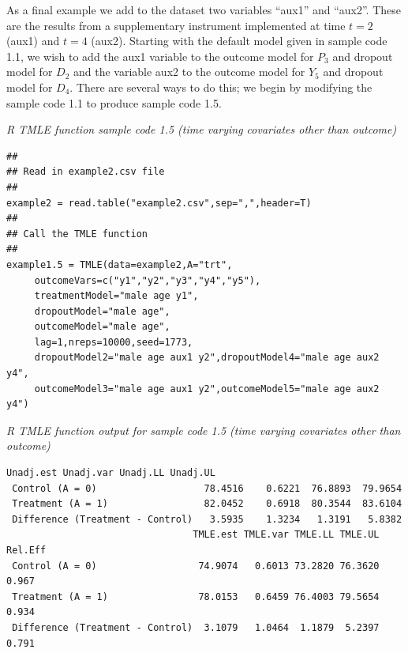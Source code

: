\documentclass[10pt]{article}
\renewcommand{\baselinestretch}{1.3}
\begin{document}
As a final example we add to the dataset two variables ``aux1'' and ``aux2''.  These are the results from a supplementary instrument implemented at time $t=2$ (aux1) and $t=4$ (aux2).  Starting with the default model given in sample code 1.1, we wish to add the aux1 variable to the outcome model for $P_3$ and dropout model for $D_2$ and the variable aux2 to the outcome model for $Y_5$ and dropout model for $D_4$.  There are several ways to do this; we begin by modifying the sample code 1.1 to produce sample code 1.5.
\newpage
\begin{minipage}{\textwidth}
\renewcommand{\baselinestretch}{1.0}\selectfont%
\begin{minipage}[l]{5.6in}
\normalsize\em%
R TMLE function sample code 1.5 (time varying covariates other than outcome)
\end{minipage}\vspace{-0.08in}
\begin{Verbatim}[baselinestretch=1.0, fontsize=\small, frame=single, commandchars=\\\{\}]
##
## Read in example2.csv file
##
example2 = read.table("example2.csv",sep=",",header=T)
##
## Call the TMLE function
##
example1.5 = TMLE(data=example2,A="trt",
     outcomeVars=c("y1","y2","y3","y4","y5"),
     treatmentModel="male age y1",
     dropoutModel="male age",
     outcomeModel="male age",
     lag=1,nreps=10000,seed=1773,
     dropoutModel2="male age aux1 y2",dropoutModel4="male age aux2 y4",
     outcomeModel3="male age aux1 y2",outcomeModel5="male age aux2 y4")
\end{Verbatim}
\end{minipage}
\vspace{0.2in}

\begin{minipage}{\textwidth}
\renewcommand{\baselinestretch}{1.0}\selectfont%
\begin{minipage}[l]{5.6in}
\normalsize\em%
R TMLE function output for sample code 1.5 (time varying covariates other than outcome)
\end{minipage}\vspace{-0.08in}
\begin{Verbatim}[baselinestretch=1.0, fontsize=\small, frame=single, commandchars=\\\{\}]
                                Unadj.est Unadj.var Unadj.LL Unadj.UL
 Control (A = 0)                   78.4516    0.6221  76.8893  79.9654
 Treatment (A = 1)                 82.0452    0.6918  80.3544  83.6104
 Difference (Treatment - Control)   3.5935    1.3234   1.3191   5.8382
                                 TMLE.est TMLE.var TMLE.LL TMLE.UL Rel.Eff
 Control (A = 0)                  74.9074   0.6013 73.2820 76.3620   0.967
 Treatment (A = 1)                78.0153   0.6459 76.4003 79.5654   0.934
 Difference (Treatment - Control)  3.1079   1.0464  1.1879  5.2397   0.791
\end{Verbatim}
\end{minipage}
\vspace{0.2in}
\end{document}
